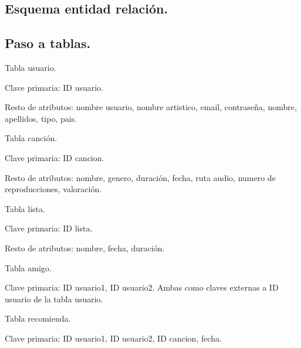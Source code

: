 \documentclass[12pt,a4paper]{article}
\begin{document}
\subsection{Esquema entidad relación.}
\begin{center}
\end{center}

\subsection{Paso a tablas.}
Tabla usuario.

	Clave primaria: ID usuario.
	
	Resto de atributos: nombre usuario, nombre artistico, email, contraseña, nombre, apellidos, tipo, pais.

Tabla canción.

	Clave primaria: ID cancion.
	
	Resto de atributos: nombre, genero, duración, fecha, ruta audio, numero de reproducciones, valoración.

Tabla lista.

	Clave primaria: ID lista.
	
	Resto de atributos: nombre, fecha, duración.
	
Tabla amigo.

	Clave primaria: ID usuario1, ID usuario2.
	Ambas como claves externas a ID usuario de la tabla usuario.
	
Tabla recomienda.

	Clave primaria: ID usuario1, ID usuario2, ID cancion, fecha.
	
\end{document}
